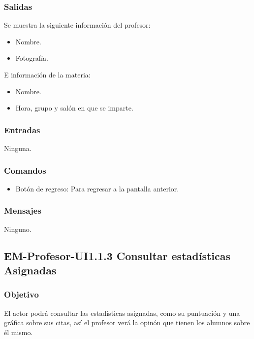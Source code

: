 
\subsubsection{Salidas}
	Se muestra la siguiente información del profesor:
	\begin{itemize}
		\item Nombre.
		\item Fotografía. 
	\end{itemize}
	E información de la materia:
	\begin{itemize}
		\item Nombre.
		\item Hora, grupo y salón en que se imparte. 
	\end{itemize}

\subsubsection{Entradas}
	\noindent
	Ninguna.

\subsubsection{Comandos}
\begin{itemize}
	\item Botón de regreso: Para regresar a la pantalla anterior.
\end{itemize}

\subsubsection{Mensajes}
\begin{Citemize}
	\item Ninguno.
\end{Citemize}
\subsection{EM-Profesor-UI1.1.3 Consultar estadísticas Asignadas}

\subsubsection{Objetivo}
	\noindent
	El actor podrá consultar las estadísticas asignadas, como su puntuación y una gráfica sobre sus citas, así el profesor verá la opinón que tienen los alumnos sobre él mismo.
